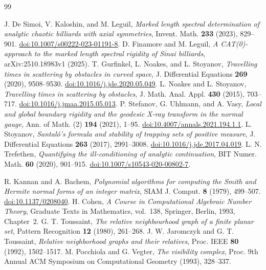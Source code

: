 \begin{thebibliography}{99}
\raggedright
{}
J. De Simoi, V. Kaloshin, and M. Leguil,
\emph{Marked length spectral determination of analytic chaotic billiards
with axial symmetries}, Invent. Math. \textbf{233} (2023), 829--901.
\href{https://doi.org/10.1007/s00222-023-01191-8}{doi:10.1007/s00222-023-01191-8}.
D. Finamore and M. Leguil,
\emph{A CAT(0)-approach to the marked length spectral rigidity of Sinai
billiards}, arXiv:2510.18983v1 (2025).
T. Gurfinkel, L. Noakes, and L. Stoyanov,
\emph{Travelling times in scattering by obstacles in curved space},
J. Differential Equations \textbf{269} (2020), 9508--9530.
\href{https://doi.org/10.1016/j.jde.2020.05.049}{doi:10.1016/j.jde.2020.05.049}.
L. Noakes and L. Stoyanov,
\emph{Travelling times in scattering by obstacles},
J. Math. Anal. Appl. \textbf{430} (2015), 703--717.
\href{https://doi.org/10.1016/j.jmaa.2015.05.013}{doi:10.1016/j.jmaa.2015.05.013}.
P. Stefanov, G. Uhlmann, and A. Vasy,
\emph{Local and global boundary rigidity and the geodesic X-ray transform
in the normal gauge}, Ann. of Math. (2) \textbf{194} (2021), 1--95.
\href{https://doi.org/10.4007/annals.2021.194.1.1}{doi:10.4007/annals.2021.194.1.1}.
L. Stoyanov,
\emph{Santal\'o's formula and stability of trapping sets of positive measure},
J. Differential Equations \textbf{263} (2017), 2991--3008.
\href{https://doi.org/10.1016/j.jde.2017.04.019}{doi:10.1016/j.jde.2017.04.019}.
L. N. Trefethen,
\emph{Quantifying the ill-conditioning of analytic continuation},
BIT Numer. Math. \textbf{60} (2020), 901--915.
\href{https://doi.org/10.1007/s10543-020-00802-7}{doi:10.1007/s10543-020-00802-7}.

R. Kannan and A. Bachem,
\emph{Polynomial algorithms for computing the Smith and Hermite normal
forms of an integer matrix}, SIAM J. Comput. \textbf{8} (1979), 499--507.
\href{https://doi.org/10.1137/0208040}{doi:10.1137/0208040}.
H. Cohen, \emph{A Course in Computational Algebraic Number Theory},
Graduate Texts in Mathematics, vol.~138, Springer, Berlin, 1993, Chapter~2.
G. T. Toussaint, \emph{The relative neighbourhood graph of a finite planar
set}, Pattern Recognition \textbf{12} (1980), 261--268.
J. W. Jaromczyk and G. T. Toussaint,
\emph{Relative neighborhood graphs and their relatives},
Proc. IEEE \textbf{80} (1992), 1502--1517.
M. Pocchiola and G. Vegter, \emph{The visibility complex},
Proc. 9th Annual ACM Symposium on Computational Geometry (1993), 328--337.
\end{thebibliography}
